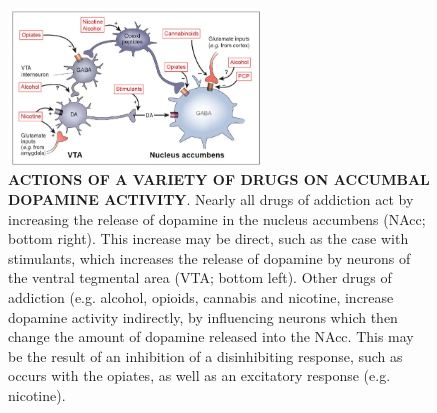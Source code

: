 \documentclass{book}
\begin{document}
\begin{figure}[H]
    \centering
    \includegraphics[width=0.6\textwidth]{images3/image14.png}
    \caption{\textbf{ACTIONS OF A VARIETY OF DRUGS ON ACCUMBAL DOPAMINE ACTIVITY}. Nearly all drugs of addiction act by increasing the release of dopamine in the nucleus accumbens (NAcc; bottom right). This increase may be direct, such as the case with stimulants, which increases the release of dopamine by neurons of the ventral tegmental area (VTA; bottom left). Other drugs of addiction (e.g. alcohol, opioids, cannabis and nicotine, increase dopamine activity indirectly, by influencing neurons which then change the amount of dopamine released into the NAcc. This may be the result of an inhibition of a disinhibiting response, such as occurs with the opiates, as well as an excitatory response (e.g. nicotine).}
\end{figure}



\printbibliography
\end{document}
